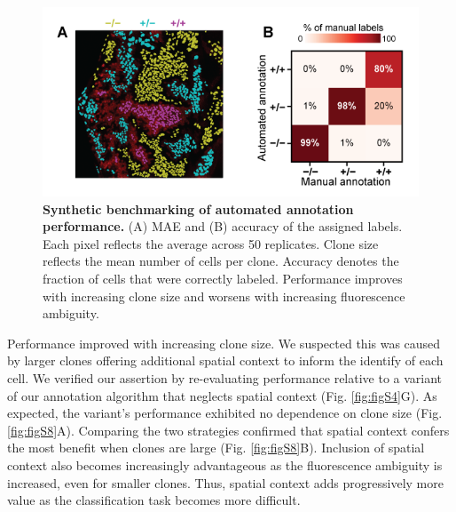 \begin{figure}[t]
\centering
\includegraphics[scale=1.0]{./figure_4}
\caption[Synthetic benchmarking of automated annotation performance.]{\textbf{Synthetic benchmarking of automated annotation performance.} (A) MAE and (B) accuracy of the assigned labels. Each pixel reflects the average across 50 replicates. Clone size reflects the mean number of cells per clone. Accuracy denotes the fraction of cells that were correctly labeled. Performance improves with increasing clone size and worsens with increasing fluorescence ambiguity.}
\label{fig:fig4}
\end{figure}

Performance improved with increasing clone size. We suspected this was caused by larger clones offering additional spatial context to inform the identify of each cell. We verified our assertion by re-evaluating performance relative to a variant of our annotation algorithm that neglects spatial context (Fig. \ref{fig:figS4}G). As expected, the variant's performance exhibited no dependence on clone size (Fig. \ref{fig:figS8}A). Comparing the two strategies confirmed that spatial context confers the most benefit when clones are large (Fig. \ref{fig:figS8}B). Inclusion of spatial context also becomes increasingly advantageous as the fluorescence ambiguity is increased, even for smaller clones. Thus, spatial context adds progressively more value as the classification task becomes more difficult.

